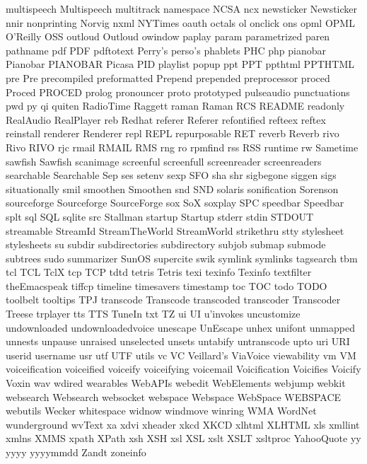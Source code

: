 multispeech
Multispeech
multitrack
namespace
NCSA
ncx
newsticker
Newsticker
nnir
nonprinting
Norvig
nxml
NYTimes
oauth
octals
ol
onclick
ons
opml
OPML
O'Reilly
OSS
outloud
Outloud
owindow
paplay
param
parametrized
paren
pathname
pdf
PDF
pdftotext
Perry's
perso's
phablets
PHC
php
pianobar
Pianobar
PIANOBAR
Picasa
PID
playlist
popup
ppt
PPT
ppthtml
PPTHTML
pre
Pre
precompiled
preformatted
Prepend
prepended
preprocessor
proced
Proced
PROCED
prolog
pronouncer
proto
prototyped
pulseaudio
punctuations
pwd
py
qi
quiten
RadioTime
Raggett
raman
Raman
RCS
README
readonly
RealAudio
RealPlayer
reb
Redhat
referer
Referer
refontified
refteex
reftex
reinstall
renderer
Renderer
repl
REPL
repurposable
RET
reverb
Reverb
rivo
Rivo
RIVO
rjc
rmail
RMAIL
RMS
rng
ro
rpmfind
rss
RSS
runtime
rw
Sametime
sawfish
Sawfish
scanimage
screenful
screenfull
screenreader
screenreaders
searchable
Searchable
Sep
ses
setenv
sexp
SFO
sha
shr
sigbegone
siggen
sigs
situationally
smil
smoothen
Smoothen
snd
SND
solaris
sonification
Sorenson
sourceforge
Sourceforge
SourceForge
sox
SoX
soxplay
SPC
speedbar
Speedbar
splt
sql
SQL
sqlite
src
Stallman
startup
Startup
stderr
stdin
STDOUT
streamable
StreamId
StreamTheWorld
StreamWorld
strikethru
stty
stylesheet
stylesheets
su
subdir
subdirectories
subdirectory
subjob
submap
submode
subtrees
sudo
summarizer
SunOS
supercite
swik
symlink
symlinks
tagsearch
tbm
tcl
TCL
TclX
tcp
TCP
tdtd
tetris
Tetris
texi
texinfo
Texinfo
textfilter
theEmacspeak
tiffcp
timeline
timesavers
timestamp
toc
TOC
todo
TODO
toolbelt
tooltips
TPJ
transcode
Transcode
transcoded
transcoder
Transcoder
Treese
trplayer
tts
TTS
TuneIn
txt
TZ
ui
UI
u'invokes
uncustomize
undownloaded
undownloadedvoice
unescape
UnEscape
unhex
unifont
unmapped
unnests
unpause
unraised
unselected
unsets
untabify
untranscode
upto
uri
URI
userid
username
usr
utf
UTF
utils
vc
VC
Veillard's
ViaVoice
viewability
vm
VM
voiceification
voiceified
voiceify
voiceifying
voicemail
Voicification
Voicifies
Voicify
Voxin
wav
wdired
wearables
WebAPIs
webedit
WebElements
webjump
webkit
websearch
Websearch
websocket
webspace
Webspace
WebSpace
WEBSPACE
webutils
Wecker
whitespace
widnow
windmove
winring
WMA
WordNet
wunderground
wvText
xa
xdvi
xheader
xkcd
XKCD
xlhtml
XLHTML
xls
xmllint
xmlns
XMMS
xpath
XPath
xsh
XSH
xsl
XSL
xslt
XSLT
xsltproc
YahooQuote
yy
yyyy
yyyymmdd
Zandt
zoneinfo
